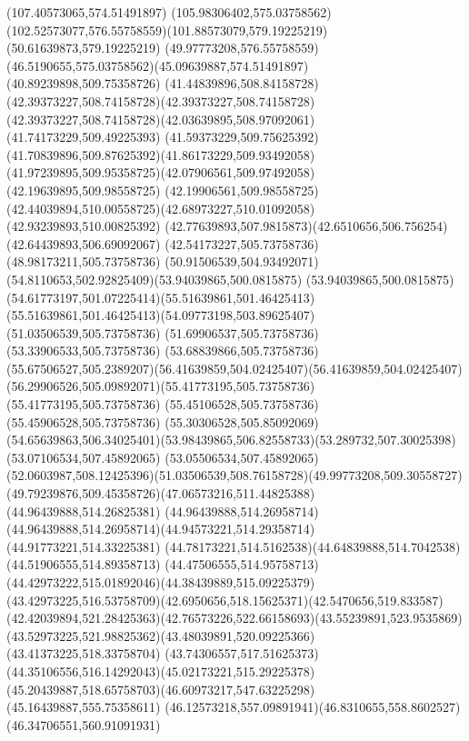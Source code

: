 {{\lineto(107.40573065,574.51491897)
\curveto(105.98306402,575.03758562)(102.52573077,576.55758559)(101.88573079,579.19225219)
\lineto(50.61639873,579.19225219)
\curveto(49.97773208,576.55758559)(46.5190655,575.03758562)(45.09639887,574.51491897)
\closepath
\moveto(40.89239898,509.75358726)
\curveto(41.44839896,508.84158728)(42.39373227,508.74158728)(42.39373227,508.74158728)
\curveto(42.39373227,508.74158728)(42.03639895,508.97092061)(41.74173229,509.49225393)
\curveto(41.59373229,509.75625392)(41.70839896,509.87625392)(41.86173229,509.93492058)
\curveto(41.97239895,509.95358725)(42.07906561,509.97492058)(42.19639895,509.98558725)
\lineto(42.19906561,509.98558725)
\curveto(42.44039894,510.00558725)(42.68973227,510.01092058)(42.93239893,510.00825392)
\curveto(42.77639893,507.9815873)(42.6510656,506.756254)(42.64439893,506.69092067)
\lineto(42.54173227,505.73758736)
\lineto(48.98173211,505.73758736)
\curveto(50.91506539,504.93492071)(54.8110653,502.92825409)(53.94039865,500.0815875)
\curveto(53.94039865,500.0815875)(54.61773197,501.07225414)(55.51639861,501.46425413)
\curveto(55.51639861,501.46425413)(54.09773198,503.89625407)(51.03506539,505.73758736)
\lineto(51.69906537,505.73758736)
\lineto(53.33906533,505.73758736)
\lineto(53.68839866,505.73758736)
\curveto(55.67506527,505.2389207)(56.41639859,504.02425407)(56.41639859,504.02425407)
\curveto(56.29906526,505.09892071)(55.41773195,505.73758736)(55.41773195,505.73758736)
\lineto(55.45106528,505.73758736)
\lineto(55.45906528,505.73758736)
\lineto(55.30306528,505.85092069)
\curveto(54.65639863,506.34025401)(53.98439865,506.82558733)(53.289732,507.30025398)
\lineto(53.07106534,507.45892065)
\lineto(53.05506534,507.45892065)
\curveto(52.0603987,508.12425396)(51.03506539,508.76158728)(49.99773208,509.30558727)
\curveto(49.79239876,509.45358726)(47.06573216,511.44825388)(44.96439888,514.26825381)
\lineto(44.96439888,514.26958714)
\curveto(44.96439888,514.26958714)(44.94573221,514.29358714)(44.91773221,514.33225381)
\curveto(44.78173221,514.5162538)(44.64839888,514.7042538)(44.51906555,514.89358713)
\curveto(44.47506555,514.95758713)(44.42973222,515.01892046)(44.38439889,515.09225379)
\curveto(43.42973225,516.53758709)(42.6950656,518.15625371)(42.5470656,519.833587)
\curveto(42.42039894,521.28425363)(42.76573226,522.66158693)(43.55239891,523.9535869)
\curveto(43.52973225,521.98825362)(43.48039891,520.09225366)(43.41373225,518.33758704)
\curveto(43.74306557,517.51625373)(44.35106556,516.14292043)(45.02173221,515.29225378)
\curveto(45.20439887,518.65758703)(46.60973217,547.63225298)(45.16439887,555.75358611)
\curveto(46.12573218,557.09891941)(46.8310655,558.8602527)(46.34706551,560.91091931)
}}
